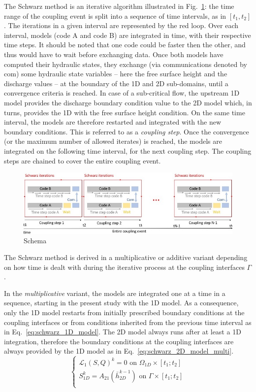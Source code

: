 \documentclass[Coupling]{../../data/TelemacDoc} %
\begin{document}
The Schwarz method is an iterative algorithm illustrated in
Fig.~\ref{fig:schemacoupling_time1}: the time range of the coupling
event is split into a sequence of time intervals, as in $[t_1, t_2]$. The
iterations in a given interval are represented by the red loop.
Over each interval,
models (code A and code B) are integrated in time, with their
respective time steps. It should be noted that one code could be
faster then the other, and thus would have to wait before exchanging
data. Once both models have computed their hydraulic states, they
exchange (via communications denoted by com) some hydraulic state
variables
-- here the free surface
height and the discharge values --
at the boundary of the 1D and 2D sub-domains, until a convergence criteria is
reached. In case of a sub-critical flow, the upstream 1D model
provides the discharge boundary condition value to the 2D model which,
in turns, provides the 1D with the free surface height condition. On
the same time interval, the models are therefore restarted and
integrated with the new boundary conditions. This is referred to as a
{\em coupling step}. Once the convergence (or the maximum number of allowed 
iterates) is reached, the models are integrated on the following time
interval, for the next coupling step. The coupling steps are chained
to cover the entire coupling event. 
\begin{figure}[htbp]
    \centering
    \includegraphics[width=12cm]{figures/schemacoupling_time1.jpeg}
    \caption{Schema}\label{fig:schemacoupling_time1}
\end{figure}

The Schwarz method is derived in a multiplicative or additive variant
depending on how time is dealt with during the iterative process at
the coupling interfaces $\Gamma$. 

In the \emph{multiplicative} variant, the models are integrated one at a
time in a sequence, starting in the present study with the 1D
model. As a consequence, only the 1D model restarts from initially 
prescribed boundary conditions at the coupling interfaces or from
conditions inherited from the previous time interval as in
Eq.~\ref{eq:schwarz_1D_model}. The 2D model 
always runs after at least a 1D integration, therefore the boundary
conditions at the coupling interfaces are always provided by the 1D
model as in Eq.~\ref{eq:schwarz_2D_model_multi}.
\begin{equation}
\left\lbrace
\begin{array}{l}
\mathcal{L}_1 (S,Q)^k = 0 \textrm{ on } \Omega_{1D} \times [t_1;t_2] \\
S_{1D}^k = A_{21}(\bar{h}_{2D}^{k-1}) \textrm{ on } \Gamma \times [t_1;t_2] \\
\end{array}
\right.
\label{eq:schwarz_1D_model}
\end{equation}
\end{document}
